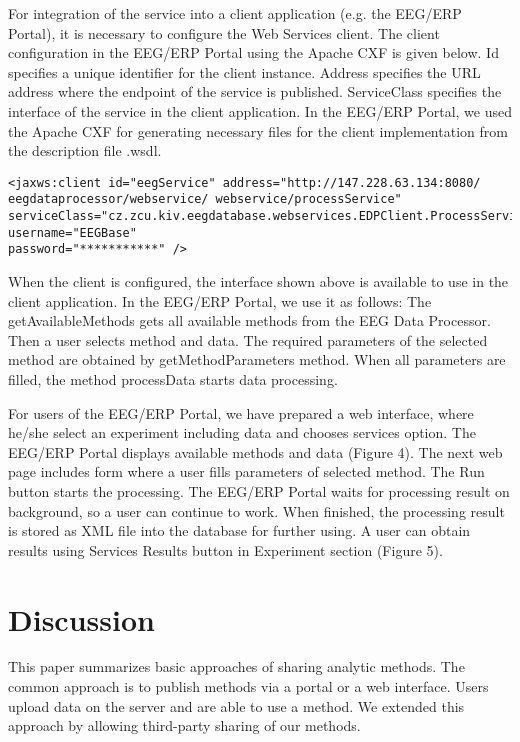 \documentclass{frontiersSCNS} %
\begin{document}
For integration of the service into a client application (e.g. the EEG/ERP Portal), it is necessary to configure the Web Services client. The client configuration in the EEG/ERP Portal using the Apache CXF is given below. Id specifies a unique identifier for the client instance. Address specifies the URL address where the endpoint of the service is published. ServiceClass specifies the interface of the service in the client application. In the EEG/ERP Portal, we used the Apache CXF for generating necessary files for the client implementation from the description file .wsdl.

\begin{small}
\begin{verbatim}
<jaxws:client id="eegService" address="http://147.228.63.134:8080/
eegdataprocessor/webservice/ webservice/processService"
serviceClass="cz.zcu.kiv.eegdatabase.webservices.EDPClient.ProcessService"
username="EEGBase"
password="***********" />
\end{verbatim}
\end{small}

When the client is configured, the interface shown above is available to use in the client application. In the EEG/ERP Portal, we use it as follows: The getAvailableMethods gets all available methods from the EEG Data Processor. Then a user selects method and data. The required parameters of the selected method are obtained by getMethodParameters method. When all parameters are filled, the method processData starts data processing.

For users of the EEG/ERP Portal, we have prepared a web interface, where he/she select an experiment including data and chooses services option. The EEG/ERP Portal displays available methods and data (Figure 4). The next web page includes form where a user fills parameters of selected method. The Run button starts the processing. The EEG/ERP Portal waits for processing result on background, so a user can continue to work. When finished, the processing result is stored as XML file into the database for further using. A user can obtain results using Services Results button in Experiment section (Figure 5).

\section{Discussion}

This paper summarizes basic approaches of sharing analytic methods. The common approach is to publish methods via a portal or a web interface. Users upload data on the server and are able to use a method. We extended this approach by allowing third-party sharing of our methods.
\end{document}
